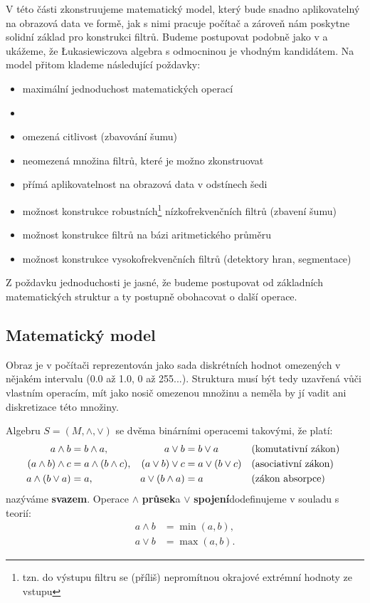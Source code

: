     V této části zkonstruujeme matematický model, který bude snadno aplikovatelný na obrazová data ve formě, jak s nimi pracuje počítač a zároveň nám poskytne solidní základ pro konstrukci filtrů. Budeme postupovat podobně jako v \cite{MajerovaPhD} a ukážeme, že \L ukasiewiczova algebra s odmocninou je vhodným kandidátem. Na model přitom klademe následující poždavky:
    \begin{itemize}
      \item maximální jednoduchost matematických operací
      \item {}
      \item omezená citlivost (zbavování šumu)
      \item neomezená množina filtrů, které je možno zkonstruovat
      \item přímá aplikovatelnost na obrazová data v odstínech šedi
      \item možnost konstrukce robustních\footnote{tzn. do výstupu filtru se (příliš) nepromítnou okrajové extrémní hodnoty ze vstupu} nízkofrekvenčních filtrů (zbavení šumu)
      \item možnost konstrukce filtrů na bázi aritmetického průměru 
      \item možnost konstrukce vysokofrekvenčních filtrů (detektory hran, segmentace)
    \end{itemize}
    Z poždavku jednoduchosti je jasné, že budeme postupovat od základních matematických struktur a ty postupně obohacovat o další operace.

    \subsection{Matematický model}

    Obraz je v počítači reprezentován jako sada diskrétních hodnot omezených v nějakém intervalu (0.0 až 1.0, 0 až 255...). Struktura musí být tedy uzavřená vůči vlastním operacím, mít jako nosič omezenou množinu a neměla by jí vadit ani diskretizace této množiny.

    \begin{define}\label{svaz}
    Algebru $S = (M,\wedge,\vee)$ se dvěma binárními operacemi takovými, že platí:
    \begin{align}
    a \wedge b &= b \wedge a, & a \vee b &= b \vee a &&\text{\textup{(}komutativní zákon\textup{)\,\,}} \\
    (a \wedge b) \wedge c &= a \wedge (b \wedge c), & (a \vee b) \vee c &= a \vee (b \vee c) &&\text{\textup{(}asociativní zákon\textup{)\,\,}} \\
    a \wedge (b \vee a) &= a,& a \vee (b \wedge a) &= a &&\text{\textup{(}zákon absorpce\textup{)\,\,}}
    \end{align}
    nazýváme \textbf{svazem}. Operace $\wedge$ \rl\textbf{průsek}\rr a $\vee$ \rl\textbf{spojení}\rr dodefinujeme v souladu s teorií:
    \begin{align}
    a \wedge b &= \min(a,b), \\
    a \vee b &= \max(a,b).
    \end{align}
    \end{define}

